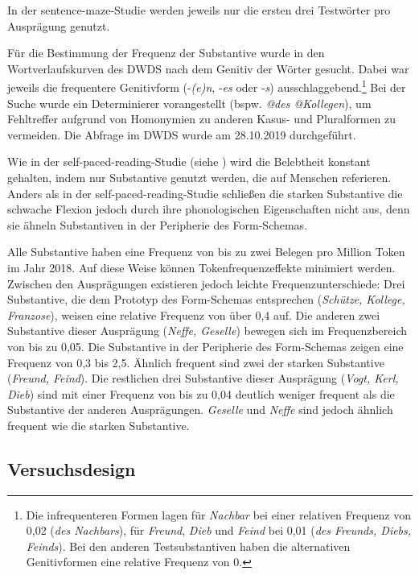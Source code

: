 In der sentence-maze-Studie werden jeweils nur die ersten drei Testwörter pro Ausprägung genutzt. 


Für die Bestimmung der Frequenz der Substantive wurde in den Wortverlaufskurven des DWDS nach dem Genitiv der Wörter gesucht.  Dabei war jeweils die frequentere Genitivform (-\textit{(e)n}, -\textit{es} oder -\textit{s}) ausschlaggebend.\footnote{Die infrequenteren Formen lagen für \textit{Nachbar} bei einer relativen Frequenz von 0,02 (\textit{des Nachbars}), für \textit{Freund}, \textit{Dieb} und \textit{Feind} bei 0,01 (\textit{des Freunds, Diebs, Feinds}). Bei den anderen Testsubstantiven haben die alternativen Genitivformen eine relative Frequenz von 0.} Bei der Suche wurde ein Determinierer vorangestellt (bspw. \textit{@des @Kollegen}), um Fehltreffer aufgrund von Homonymien zu anderen Kasus- und Pluralformen zu vermeiden. Die Abfrage im DWDS wurde am 28.10.2019 durchgeführt. 

 
Wie in der self-paced-reading-Studie (siehe ) wird die Belebtheit konstant gehalten, indem nur Substantive genutzt werden, die auf Menschen referieren. Anders als in der self-paced-reading-Studie schließen die starken Substantive die schwache Flexion jedoch durch ihre phonologischen Eigenschaften nicht aus, denn sie ähneln Substantiven in der Peripherie des Form-Schemas. 


Alle Substantive haben eine Frequenz von bis zu zwei Belegen pro Million Token im Jahr 2018. Auf diese Weise können Tokenfrequenzeffekte minimiert werden. Zwischen den Ausprägungen existieren jedoch leichte Frequenzunterschiede: Drei Substantive, die dem Prototyp des Form-Schemas entsprechen (\textit{Schütze, Kollege, Franzose}), weisen eine relative Frequenz von über 0,4 auf. Die anderen zwei Substantive dieser Ausprägung (\textit{Neffe, Geselle})  bewegen sich im Frequenzbereich von bis zu 0,05. Die Substantive in der Peripherie des Form-Schemas zeigen eine Frequenz von 0,3 bis 2,5. Ähnlich frequent sind zwei der starken Substantive (\textit{Freund, Feind}). Die restlichen drei Substantive dieser Ausprägung (\textit{Vogt, Kerl, Dieb}) sind mit einer Frequenz von bis zu 0,04 deutlich weniger frequent als die Substantive der anderen Ausprägungen. \textit{Geselle} und \textit{Neffe} sind jedoch ähnlich frequent wie die starken Substantive. 

\subsection{Versuchsdesign}
\label{schemadesignsent}

